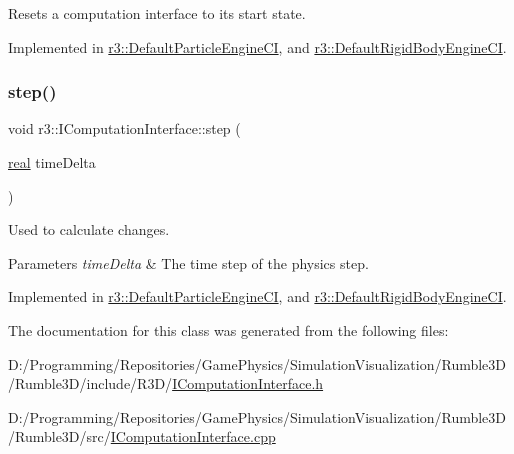 Resets a computation interface to its start state. 



Implemented in \mbox{\hyperlink{classr3_1_1_default_particle_engine_c_i_a97757c62b4cb1266da29e2b5625bb9d3}{r3\+::\+Default\+Particle\+Engine\+CI}}, and \mbox{\hyperlink{classr3_1_1_default_rigid_body_engine_c_i_a06bd27e94b26017e7960e01f6e884e33}{r3\+::\+Default\+Rigid\+Body\+Engine\+CI}}.

\mbox{\label{classr3_1_1_i_computation_interface_aaa12bcc35005f32a1984b38de97696cb}} 
\subsubsection{\texorpdfstring{step()}{step()}}
{\footnotesize\ttfamily void r3\+::\+I\+Computation\+Interface\+::step (\begin{DoxyParamCaption}\item[{\mbox{\hyperlink{namespacer3_ab2016b3e3f743fb735afce242f0dc1eb}{real}}}]{time\+Delta }\end{DoxyParamCaption})\hspace{0.3cm}{\ttfamily [pure virtual]}}



Used to calculate changes. 


\begin{DoxyParams}{Parameters}
{\em time\+Delta} & The time step of the physics step. \\
\hline
\end{DoxyParams}


Implemented in \mbox{\hyperlink{classr3_1_1_default_particle_engine_c_i_a7c58fd00ec521410e1b412e9885ee0d2}{r3\+::\+Default\+Particle\+Engine\+CI}}, and \mbox{\hyperlink{classr3_1_1_default_rigid_body_engine_c_i_ac45ae1d1889c75e6839b865870cbf59c}{r3\+::\+Default\+Rigid\+Body\+Engine\+CI}}.



The documentation for this class was generated from the following files\+:\begin{DoxyCompactItemize}
\item 
D\+:/\+Programming/\+Repositories/\+Game\+Physics/\+Simulation\+Visualization/\+Rumble3\+D/\+Rumble3\+D/include/\+R3\+D/\mbox{\hyperlink{_i_computation_interface_8h}{I\+Computation\+Interface.\+h}}\item 
D\+:/\+Programming/\+Repositories/\+Game\+Physics/\+Simulation\+Visualization/\+Rumble3\+D/\+Rumble3\+D/src/\mbox{\hyperlink{_i_computation_interface_8cpp}{I\+Computation\+Interface.\+cpp}}\end{DoxyCompactItemize}
